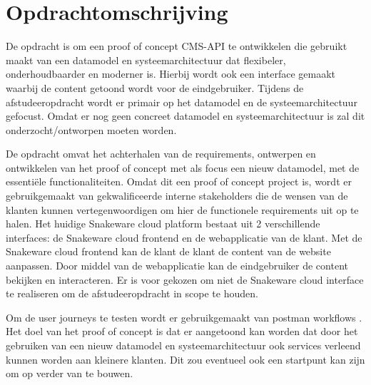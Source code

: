 \section{Opdrachtomschrijving}
De opdracht is om een proof of concept CMS-API te ontwikkelen die gebruikt maakt van een datamodel en systeemarchitectuur dat flexibeler, onderhoudbaarder en moderner is.
Hierbij wordt ook een interface gemaakt waarbij de content getoond wordt voor de eindgebruiker.
Tijdens de afstudeeropdracht wordt er primair op het datamodel en de systeemarchitectuur gefocust.
Omdat er nog geen concreet datamodel en systeemarchitectuur is zal dit onderzocht/ontworpen moeten worden.

\whitespace[2]
De opdracht omvat het achterhalen van de requirements, ontwerpen en ontwikkelen van het proof of concept met als focus een nieuw datamodel, met de essentiële functionaliteiten.
Omdat dit een proof of concept project is, wordt er gebruikgemaakt van gekwalificeerde interne stakeholders die de wensen van de klanten kunnen vertegenwoordigen om hier de functionele requirements uit op te halen.
Het huidige Snakeware cloud platform bestaat uit 2 verschillende interfaces: de Snakeware cloud frontend en de webapplicatie van de klant.
Met de Snakeware cloud frontend kan de klant de klant de content van de website aanpassen.
Door middel van de webapplicatie kan de eindgebruiker de content bekijken en interacteren.
Er is voor gekozen om niet de Snakeware cloud interface te realiseren om de afstudeeropdracht in scope te houden.

\whitespace[2]
Om de user journeys te testen wordt er gebruikgemaakt van postman workflows \Parencite{PostmanWorkflows}.
Het doel van het proof of concept is dat er aangetoond kan worden dat door het gebruiken van een nieuw datamodel en systeemarchitectuur ook services verleend kunnen worden aan kleinere klanten.
Dit zou eventueel ook een startpunt kan zijn om op verder van te bouwen.

